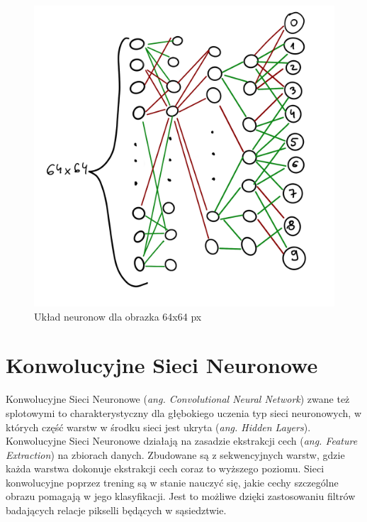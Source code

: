 \documentclass[openright]{xmgr}
\begin{document}
\begin{figure}[!tbh]
\centering
\includegraphics[width=.8\hsize]{fig/2}
\caption{Układ neuronow dla obrazka 64x64 px\label{RYS.2}}
\end{figure}


\section{Konwolucyjne Sieci Neuronowe  \label{s:dsssl}}


\indent \indent Konwolucyjne Sieci Neuronowe (\textit{ang. Convolutional Neural Network}) zwane też splotowymi to charakterystyczny dla głębokiego uczenia typ sieci neuronowych, w których część warstw w środku sieci jest ukryta (\textit{ang. Hidden Layers}). Konwolucyjne Sieci Neuronowe działają na zasadzie ekstrakcji cech (\textit{ang. Feature Extraction}) na zbiorach danych. Zbudowane są z sekwencyjnych warstw, gdzie każda warstwa dokonuje ekstrakcji cech coraz to wyższego poziomu.
Sieci konwolucyjne poprzez trening są w stanie nauczyć się, jakie cechy szczególne obrazu pomagają w jego klasyfikacji. Jest to możliwe dzięki zastosowaniu filtrów badających relacje pikselli będących w sąsiedztwie. 
\end{document}
